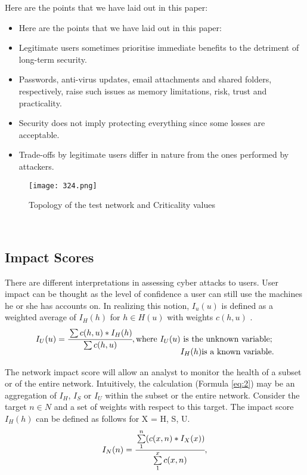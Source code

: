 \documentclass{ledger}
\begin{document}
Here are the points that we have laid out in this paper:
\begin{itemize}
    \item Here are the points that we have laid out in this paper:
    \item Legitimate users sometimes prioritise immediate benefits to the detriment of long-term security. 
    \item Passwords, anti-virus updates, email attachments and shared folders, respectively, raise such issues as memory limitations, risk, trust and practicality. 
    \item Security does not imply protecting everything since some losses are acceptable.  
    \item Trade-offs by legitimate users differ in nature from the ones performed by attackers. 
\end{itemize}
    


\begin{figure}[H]
    \centering
    \texttt{[image: 324.png]}
    \caption{Topology of the test network and Criticality values}
    \label{fig2:enter-label}
\end{figure}
\


\subsection{Impact Scores}
There are different interpretations in assessing cyber attacks to users. User impact can be thought as the level of confidence a user can still use the machines he or she has accounts on. In realizing this notion, $I_u(u)$  is defined as a weighted average of $I_H(h)$ for $h \in H(u)$  with weights $c(h, u)$ .
\begin{equation}
\label{eq:1}
   I_U(u)=\cfrac{\sum c(h, u)*I_H(h)}{\sum c(h,u)},
   \begin{aligned}[t]
        \text{where } I_U(u) & \text{ is the unknown variable;} \\
                        & I_H(h)\text{is a known variable.}
    \end{aligned}
\end{equation}


The network impact score will allow an analyst to monitor the health of a subset or of the entire network. Intuitively, the calculation (Formula \ref{eq:2}) may be an aggregation of $I_H$, $I_S$ or $I_U$  within the subset or the entire network. Consider the target $n\in N$ and a set of weights with respect to this target. The impact score $I_H(h)$ can be defined as follows for X = H, S, U.
\begin{equation}
\label{eq:2}
    I_N(n)=\cfrac{\sum\limits_{1}^n (c(x, n)*I_X(x))}{\sum\limits_{1}^x c(x,n)},
\end{equation}
\end{document}
